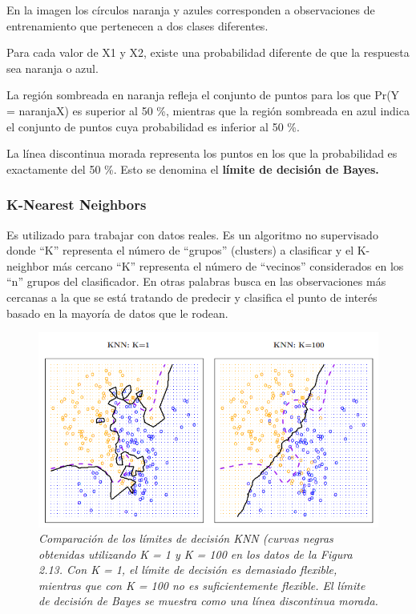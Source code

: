 \documentclass[
  letterpaper,
  DIV=11,
  numbers=noendperiod]{scrartcl}
\begin{document}
En la imagen los círculos naranja y azules corresponden a observaciones
de entrenamiento que pertenecen a dos clases diferentes.

Para cada valor de X1 y X2, existe una probabilidad diferente de que la
respuesta sea naranja o azul.

La región sombreada en naranja refleja el conjunto de puntos para los
que Pr(Y = naranja\textbar X) es superior al 50 \%, mientras que la
región sombreada en azul indica el conjunto de puntos cuya probabilidad
es inferior al 50 \%.

La línea discontinua morada representa los puntos en los que la
probabilidad es exactamente del 50 \%. Esto se denomina el
\textbf{límite de decisión de Bayes.}

\hypertarget{k-nearest-neighbors}{%
\subsubsection{K-Nearest Neighbors}\label{k-nearest-neighbors}}

Es utilizado para trabajar con datos reales. Es un algoritmo no
supervisado donde ``K'' representa el número de ``grupos'' (clusters) a
clasificar y el K-neighbor más cercano ``K'' representa el número de
``vecinos'' considerados en los ``n'' grupos del clasificador. En otras
palabras busca en las observaciones más cercanas a la que se está
tratando de predecir y clasifica el punto de interés basado en la
mayoría de datos que le rodean.

\begin{figure}

{\centering \includegraphics[width=4.64583in,height=\textheight]{images/k-neig.png}

}

\caption{\emph{Comparación de los límites de decisión KNN (curvas negras
obtenidas utilizando K = 1 y K = 100 en los datos de la Figura 2.13. Con
K = 1, el límite de decisión es demasiado flexible, mientras que con K =
100 no es suficientemente flexible. El límite de decisión de Bayes se
muestra como una línea discontinua morada.}}

\end{figure}
\end{document}

